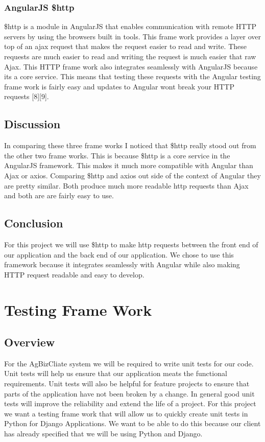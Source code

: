 \documentclass[onecolumn, draftclsnofoot,10pt, compsoc]{article}
\begin{document}
		\subsubsection{AngularJS \$http}
		\$http is a module in AngularJS that enables communication with remote HTTP servers by using the browsers built in tools. This frame work provides a layer over top of an ajax request that makes the request easier to read and write. These requests are much easier to read and writing the request is much easier that raw Ajax. This HTTP frame work also integrates seamlessly with AngularJS because its a core service. This means that testing these requests with the Angular testing frame work is fairly easy and updates to Angular wont break your HTTP requests [8][9].
	\subsection{Discussion}
		In comparing these three frame works I noticed that \$http really stood out from the other two frame works. This is because \$http is a core service in the AngularJS framework. This makes it much more compatible with Angular than Ajax or axios. Comparing \$http and axios out side of the context of Angular they are pretty similar. Both produce much more readable http requests than Ajax and both are are fairly easy to use.
	\subsection{Conclusion}
	For this project we will use \$http to make http requests between the front end of our application and the back end of our application. We chose to use this framework because it integrates seamlessly with Angular while also making HTTP request readable and easy to develop.
	
\section{Testing Frame Work}
	\subsection{Overview}
						For the AgBizCliate system we will be required to write unit tests for our code. Unit tests will help us ensure that our application meats the functional requirements. Unit tests will also be helpful for feature projects to ensure that parts of the application have not been broken by a change. In general good unit tests will improve the reliability and extend the life of a project. For this project we want a testing frame work that will allow us to quickly create unit tests in Python for Django Applications. We want to be able to do this because our client has already specified that we will be using Python and Django.\\
\end{document}
